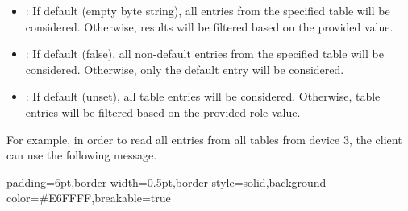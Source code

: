 \documentclass[11pt]{article}
\begin{document}
{\begin{itemize}[noitemsep,topsep=\mdcompacttopsep]
\item{}: If default (empty byte string), all entries from the specified
table will be considered. Otherwise, results will be filtered based on the
provided  value.%

\item{}: If default (false), all non-default entries from the
specified table will be considered. Otherwise, only the default entry will be
considered.%

\item{}: If default (unset), all table entries will be considered. Otherwise,
table entries will be filtered based on the provided role value.%
\end{itemize}%

\noindent{}For example, in order to read all entries from all tables from device 3, the
client can use the following  message.%

\begin{mdbmargintb}{6pt}{6pt}%
\begin{mdblock}{padding=6pt,border-width=0.5pt,border-style=solid,background-color=\#E6FFFF,breakable=true}%
\begin{mdpre}%
\end{mdpre}%
\end{mdblock}%
\end{mdbmargintb}%

}
\end{document}
